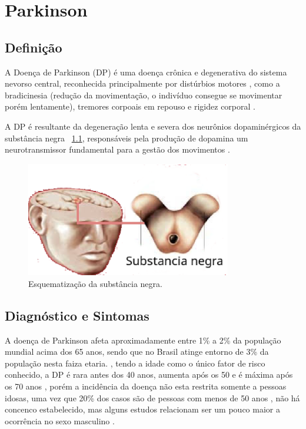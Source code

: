 \chapter{Parkinson}
\section{Definição}

A Doença de Parkinson (DP) é uma doença crônica e degenerativa do sistema nevorso central, reconhecida principalmente por distúrbios motores \cite{souzametodos}, como a bradicinesia (redução da movimentação, o indivíduo consegue se movimentar porém lentamente), tremores corpoais em repouso e rigidez corporal \cite{da2016aspectos}.

A DP é resultante da degeneração lenta e severa dos neurônios dopaminérgicos da substância negra 
~\ref{substanciaNegra}, responsáveis pela produção de dopamina um neurotransmissor fundamental para a gestão dos movimentos \cite{eftaxias2015detection}.

\begin{figure}[!htb]
    \centering
	\includegraphics[width=0.8\textwidth]{figuras/substancia_negra.eps}
	\caption{Esquematização da substância negra.}
	\label{substanciaNegra}
\end{figure}

\section{Diagnóstico e Sintomas}
A doença de Parkinson afeta aproximadamente entre 1\% a 2\% da população mundial acima dos 65 anos, sendo que no Brasil atinge entorno de 3\% da população nesta faiza etaria. \cite{magalhaes2009descobrindo}, tendo a idade como o único fator de risco conhecido, a DP é rara antes dos 40 anos, aumenta após os 50 e é máxima após os 70 anos \cite{peixinho2006alteraccoes}, porém a incidência da doença não esta restrita somente a pessoas idosas, uma vez que 20\% dos casos são de pessoas com menos de 50 anos \cite{gago2014manual}, não há concenco estabelecido, mas alguns estudos relacionam ser um pouco maior a ocorrência no sexo masculino \cite{peixinho2006alteraccoes}.

